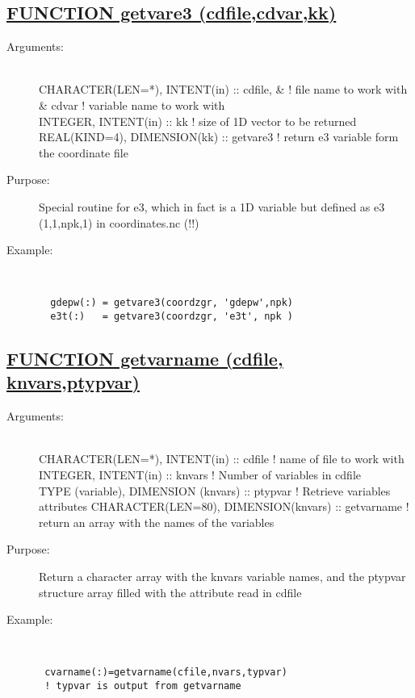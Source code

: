 \documentclass[a4paper,11pt]{article}
\begin{document}
\subsection*{\underline{FUNCTION getvare3 (cdfile,cdvar,kk) }}
\begin{description}
\item[Arguments:] \ \\
    CHARACTER(LEN=*), INTENT(in) :: cdfile,     \&   ! file name to work with \\
         \&                          cdvar           ! variable name to work with \\
    INTEGER, INTENT(in) :: kk                       ! size of 1D vector to be returned \\
    REAL(KIND=4), DIMENSION(kk) :: getvare3         ! return e3 variable form the coordinate file
\item[Purpose:]  Special routine for e3, which in fact is a 1D variable
    but defined as e3 (1,1,npk,1) in coordinates.nc (!!)
\item[Example:]\ \\
\begin{verbatim}
  gdepw(:) = getvare3(coordzgr, 'gdepw',npk)
  e3t(:)   = getvare3(coordzgr, 'e3t', npk )
\end{verbatim}
\end{description}
\newpage

\subsection*{\underline{FUNCTION getvarname (cdfile, knvars,ptypvar) }}
\begin{description}
\item[Arguments:] \ \\
    CHARACTER(LEN=*), INTENT(in) :: cdfile           ! name of file to work with \\
    INTEGER, INTENT(in)  ::  knvars                  ! Number of variables in cdfile \\
    TYPE (variable), DIMENSION (knvars) :: ptypvar   ! Retrieve variables attributes
    CHARACTER(LEN=80), DIMENSION(knvars) :: getvarname ! return an array with the names of the variables
\item[Purpose:]  Return a character array with the knvars variable names, and the ptypvar structure array filled with the attribute
               read in cdfile
\item[Example:]\ \\
\begin{verbatim}
 cvarname(:)=getvarname(cfile,nvars,typvar)
 ! typvar is output from getvarname
\end{verbatim}
\end{description}
\newpage
\end{document}
